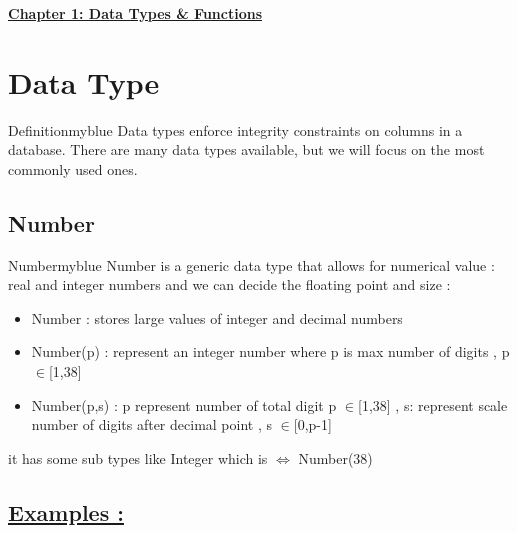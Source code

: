 \begin{center} 
    \Huge{\textbf{\underline{Chapter 1: Data Types \& Functions}}}
    \end{center}

\vspace{0.25cm}



\section{Data Type}

\begin{prettyBox}{Definition}{myblue}
Data types enforce integrity constraints on columns in a database. There are many data types
available, but we will focus on the most commonly used ones.
\end{prettyBox}


\subsection{Number}

\begin{prettyBox}{Number}{myblue}
Number is a generic data type that allows for  numerical value : real and integer numbers 
and we can decide the floating point and size :
\begin{itemize}
    \item Number : stores large values of integer and decimal numbers 
    \item Number(p) : represent an integer number where p is max number of digits , p \(\in\)[1,38]
    \item Number(p,s) : p represent number of total digit p \(\in\)[1,38] , s: represent scale
number of digits after decimal point , s \(\in\)[0,p-1]
\end{itemize}

it has some sub types like Integer which is \(\Leftrightarrow\) Number(38)
\end{prettyBox}

\subsection*{\underline{Examples :}}

